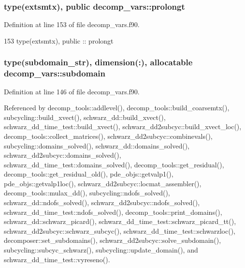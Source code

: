 \subsubsection[{prolongt}]{\setlength{\rightskip}{0pt plus 5cm}type({\bf extsmtx}), public decomp\+\_\+vars\+::prolongt}\label{namespacedecomp__vars_a13985a0b03c1bdc8a95f3d38a650cc53}


Definition at line 153 of file decomp\+\_\+vars.\+f90.


\begin{DoxyCode}
153   \textcolor{keywordtype}{type}(extsmtx), \textcolor{keywordtype}{public} :: prolongt
\end{DoxyCode}
\subsubsection[{subdomain}]{\setlength{\rightskip}{0pt plus 5cm}type({\bf subdomain\+\_\+str}), dimension(\+:), allocatable decomp\+\_\+vars\+::subdomain}\label{namespacedecomp__vars_a197464956dc4c702935cf963d48a4edf}


Definition at line 146 of file decomp\+\_\+vars.\+f90.



Referenced by decomp\+\_\+tools\+::addlevel(), decomp\+\_\+tools\+::build\+\_\+coarsemtx(), subcycling\+::build\+\_\+xvect(), schwarz\+\_\+dd\+::build\+\_\+xvect(), schwarz\+\_\+dd\+\_\+time\+\_\+test\+::build\+\_\+xvect(), schwarz\+\_\+dd2subcyc\+::build\+\_\+xvect\+\_\+loc(), decomp\+\_\+tools\+::collect\+\_\+matrices(), schwarz\+\_\+dd2subcyc\+::combinevals(), subcycling\+::domains\+\_\+solved(), schwarz\+\_\+dd\+::domains\+\_\+solved(), schwarz\+\_\+dd2subcyc\+::domains\+\_\+solved(), schwarz\+\_\+dd\+\_\+time\+\_\+test\+::domains\+\_\+solved(), decomp\+\_\+tools\+::get\+\_\+residual(), decomp\+\_\+tools\+::get\+\_\+residual\+\_\+old(), pde\+\_\+objs\+::getvalp1(), pde\+\_\+objs\+::getvalp1loc(), schwarz\+\_\+dd2subcyc\+::locmat\+\_\+assembler(), decomp\+\_\+tools\+::mulax\+\_\+dd(), subcycling\+::ndofs\+\_\+solved(), schwarz\+\_\+dd\+::ndofs\+\_\+solved(), schwarz\+\_\+dd2subcyc\+::ndofs\+\_\+solved(), schwarz\+\_\+dd\+\_\+time\+\_\+test\+::ndofs\+\_\+solved(), decomp\+\_\+tools\+::print\+\_\+domains(), schwarz\+\_\+dd\+::schwarz\+\_\+picard(), schwarz\+\_\+dd\+\_\+time\+\_\+test\+::schwarz\+\_\+picard\+\_\+tt(), schwarz\+\_\+dd2subcyc\+::schwarz\+\_\+subcyc(), schwarz\+\_\+dd\+\_\+time\+\_\+test\+::schwarzloc(), decomposer\+::set\+\_\+subdomains(), schwarz\+\_\+dd2subcyc\+::solve\+\_\+subdomain(), subcycling\+::subcyc\+\_\+schwarz(), subcycling\+::update\+\_\+domain(), and schwarz\+\_\+dd\+\_\+time\+\_\+test\+::vyreseno().



